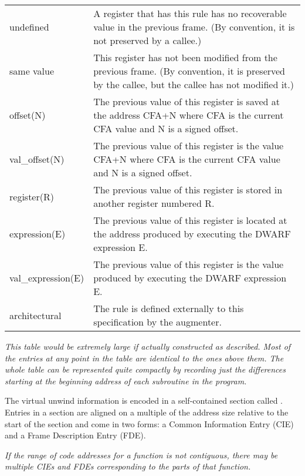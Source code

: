 \begin{tabular}{lp{8cm}}
undefined 
&A register that has this rule has no recoverable value in the previous frame.
(By convention, it is not preserved by a callee.) \\

same value
&This register has not been modified from the previous frame. (By convention,
it is preserved by the callee, but the callee has not modified it.) \\

offset(N)
&The previous value of this register is saved at the address CFA+N where CFA
is the current CFA value and N is a signed offset.\\

val\_offset(N)
&The previous value of this register is the value CFA+N where CFA is the
current CFA value and N is a signed offset.\\

register(R)
&The previous value of this register is stored 
in another register numbered R.\\

expression(E)
&The previous value of this register is located at the address produced by
executing the DWARF expression E.\\

val\_expression(E) 
&The previous value of this register is the value produced by executing the
DWARF expression E.\\

architectural
&The rule is defined externally to this specification by the augmenter.\\

\end{tabular}

\textit{This table would be extremely large if actually constructed
as described. Most of the entries at any point in the table
are identical to the ones above them. The whole table can be
represented quite compactly by recording just the differences
starting at the beginning address of each subroutine in
the program.}

The virtual unwind information is encoded in a self-contained
section called 
.  Entries in a 
 section
are aligned on a multiple of the address size relative to
the start of the section and come in two forms: a Common
Information Entry (CIE) and a Frame Description Entry (FDE).

\textit{If the range of code addresses for a function is not
contiguous, there may be multiple CIEs and FDEs corresponding
to the parts of that function.}


